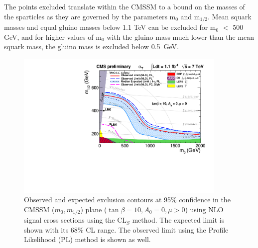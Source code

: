 The points excluded translate within the CMSSM to a bound on the masses of the sparticles as they are governed by the parameters m$_{0}$ and m$_{1/2}$. Mean squark masses and equal gluino masses below 1.1 TeV can be excluded for m$_{0}$ $<$ 500 GeV, and for higher values of m$_{0}$ with the gluino mass much lower than the mean squark mass, the gluino mass is excluded below 0.5~GeV.

\begin{figure}[htbp]
  \begin{center}
    \includegraphics[width = 0.90\textwidth]{Figures/Analysis/PAS/RA1_ExclusionLimit_tanb10_def.pdf}
    \caption{\label{fig:cmssm} Observed and expected exclusion
      contours at 95\% confidence in the CMSSM ($m_0, m_{1/2}$) plane ($\tan \beta = 10,
A_0 = 0, \mu > 0$) using NLO signal cross sections using the
       CL$_{S}$ method. The expected limit is shown with
      its 68\% CL range. The observed limit using the Profile Likelihood (PL) method is
      shown as well. }
  \end{center}
\end{figure}


